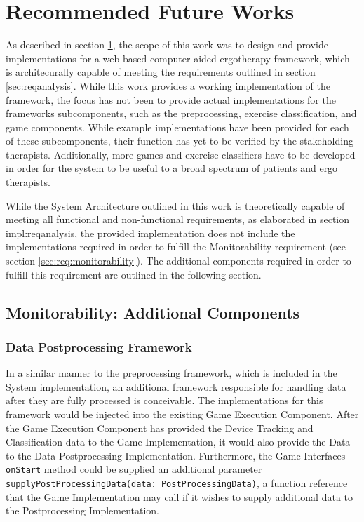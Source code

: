 \chapter{Recommended Future Works}
\label{sec:future}
As described in section \ref{sec:future}, the scope of this work was to design and provide implementations for a web based computer aided ergotherapy framework, which is architecurally capable of meeting the requirements outlined in section \ref{sec:reqanalysis}. While this work provides a working implementation of the framework, the focus has not been to provide actual implementations for the frameworks subcomponents, such as the preprocessing, exercise classification, and game components. While example implementations have been provided for each of these subcomponents, their function has yet to be verified by the stakeholding therapists. Additionally, more games and exercise classifiers have to be developed in order for the system to be useful to a broad spectrum of patients and ergo therapists. 

While the System Architecture outlined in this work is theoretically capable of meeting all functional and non-functional requirements, as elaborated in section impl:reqanalysis, the provided implementation does not include the implementations required in order to fulfill the Monitorability requirement (see section \ref{sec:req:monitorability}). The additional components required in order to fulfill this requirement are outlined in the following section.
\section{Monitorability: Additional Components}
\subsection{Data Postprocessing Framework}
\label{sec:future:data-postprocessing-framework}
In a similar manner to the preprocessing framework, which is included in the System implementation, an additional framework responsible for handling data after they are fully processed is conceivable. The implementations for this framework would be injected into the existing Game Execution Component. After the Game Execution Component has provided the Device Tracking and Classification data to the Game Implementation, it would also provide the Data to the Data Postprocessing Implementation. Furthermore, the Game Interfaces \texttt{onStart} method could be supplied an additional parameter \texttt{supplyPostProcessingData(data: PostProcessingData)}, a function reference that the Game Implementation may call if it wishes to supply additional data to the Postprocessing Implementation.

